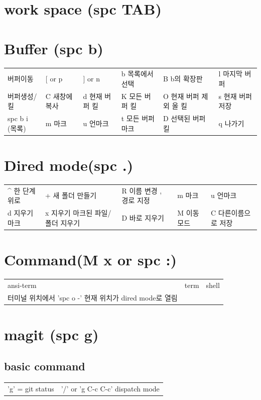\documentclass[11pt]{article}
\begin{document}
\section{work space (spc TAB)}
\label{sec:org9658dc1}
\section{Buffer (spc b)}
\label{sec:orgd457401}
\begin{center}
\begin{tabular}{llllll}
버퍼이동 & [ or p & ] or n & b 목록에서 선택 & B b의 확장판 & l 마지막 버퍼\\
버퍼생성/킬 & C 새창에 복사 & d 현재 버퍼 킬 & K 모든 버퍼 킬 & O 현재 버퍼 제외 올 킬 & s 현재 버퍼 저장\\
spc b i (목록) & m 마크 & u 언마크 & t 모든 버퍼 마크 & D  선택된 버퍼 킬 & q 나가기\\
\end{tabular}
\end{center}
\section{Dired mode(spc .)}
\label{sec:org278f5fa}
\begin{center}
\begin{tabular}{lllll}
\^{} 한 단계 위로 & + 새 폴더 만들기 & R 이름 변경 , 경로 지정 & m 마크 & u 언마크\\
d 지우기 마크 & x 지우기 마크된 파일/폴더 지우기 & D 바로 지우기 & M 이동 모드 & C 다른이름으로 저장\\
\end{tabular}
\end{center}
\section{Command(M x or spc :)}
\label{sec:org09842a3}
\begin{center}
\begin{tabular}{lll}
ansi-term & term & shell\\
터미널 위치에서 'spc o -' 현재 위치가 dired mode로 열림 &  & \\
\end{tabular}
\end{center}
\section{magit (spc g)}
\label{sec:org1108879}
\subsection{basic command}
\label{sec:org66f527c}
\begin{center}
\begin{tabular}{ll}
'g' = git status & '/' or 'g C-c C-c'  dispatch mode\\
\end{tabular}
\end{center}
\end{document}
